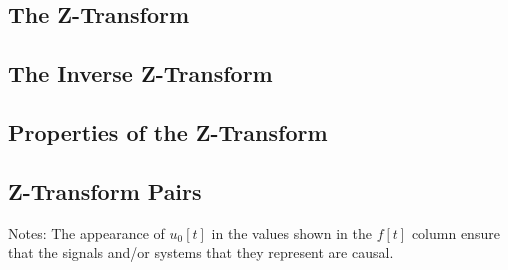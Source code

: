 \subsection*{The Z-Transform}

\subsection*{The Inverse Z-Transform}

\subsection*{Properties of the Z-Transform}

\subsection*{Z-Transform Pairs}
Notes: The appearance of $u_0[t]$ in the values shown in the $f[t]$ column ensure that 
the signals and/or systems that they represent are causal.
    
\endinput
